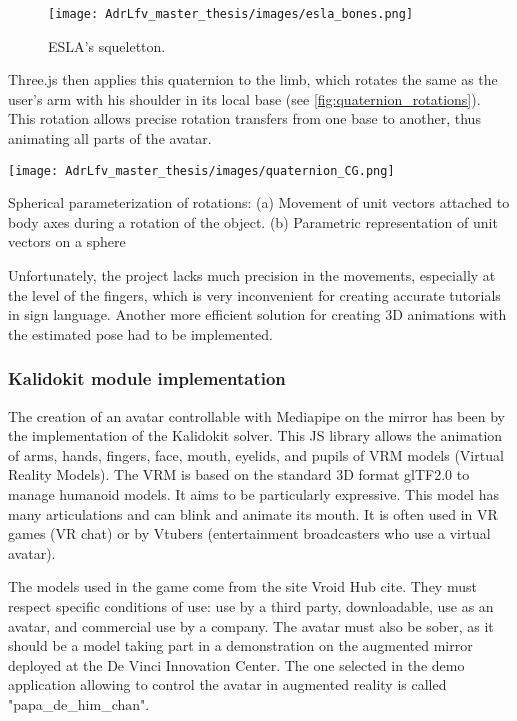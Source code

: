 \begin{figure}[h]
    \centering
    \texttt{[image: AdrLfv\_master\_thesis/images/esla\_bones.png]}
    \caption{ESLA's squeletton.}
    \label{fig:esla_bones}
\end{figure}

Three.js then applies this quaternion to the limb, which rotates the same as the user's arm with his shoulder in its local base (see \ref{fig:quaternion_rotations}). This rotation allows precise rotation transfers from one base to another, thus animating all parts of the avatar.

\begin{marginfigure}
    \centering
    \texttt{[image: AdrLfv\_master\_thesis/images/quaternion\_CG.png]}
    \caption{Spherical parameterization of rotations: (a) Movement of unit vectors attached to body axes during a rotation of the object. (b) Parametric representation of unit vectors on a sphere \cite{what_when_how}}
    \label{fig:quaternion_rotations}
\end{marginfigure}

Unfortunately, the project lacks much precision in the movements, especially at the level of the fingers, which is very inconvenient for creating accurate tutorials in sign language. Another more efficient solution for creating 3D animations with the estimated pose had to be implemented.

\subsubsection{Kalidokit module implementation}

The creation of an avatar controllable with Mediapipe on the mirror has been by the implementation of the Kalidokit solver. This JS library allows the animation of arms, hands, fingers, face, mouth, eyelids, and pupils of VRM models (Virtual Reality Models). The VRM is based on the standard 3D format glTF2.0 to manage humanoid models. It aims to be particularly expressive. This model has many articulations and can blink and animate its mouth. It is often used in VR games (VR chat) or by Vtubers (entertainment broadcasters who use a virtual avatar).  

The models used in the game come from the site Vroid Hub cite\cite{vroid}. They must respect specific conditions of use: use by a third party, downloadable, use as an avatar, and commercial use by a company. The avatar must also be sober, as it should be a model taking part in a demonstration on the augmented mirror deployed at the De Vinci Innovation Center. The one selected in the demo application allowing to control the avatar in augmented reality is called "papa\_de\_him\_chan". 

